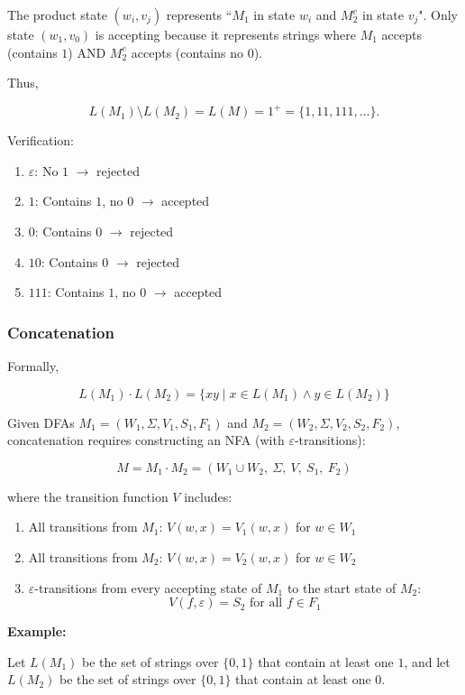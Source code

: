 \documentclass[12pt,a4paper,openany]{article}
\begin{document}
The product state $(w_i, v_j)$ represents ``$M_1$ in state $w_i$ and $M_2^c$ in state $v_j$". Only state $(w_1, v_0)$ is accepting because it represents strings where $M_1$ accepts (contains $1$) AND $M_2^c$ accepts (contains no $0$).

Thus,

\[
L(M_1) \setminus L(M_2) = L(M) = 1^+ = \{1, 11, 111, \ldots\}.
\]

Verification:

\begin{enumerate}
    \item $\varepsilon$: No $1$ $\to$ rejected 
    \item $1$: Contains $1$, no $0$ $\to$ accepted 
    \item $0$: Contains $0$ $\to$ rejected 
    \item $10$: Contains $0$ $\to$ rejected 
    \item $111$: Contains $1$, no $0$ $\to$ accepted 
\end{enumerate}

\subsubsection{Concatenation}

Formally,

\[L(M_1) \cdot L(M_2) = \{xy \mid x \in L(M_1) \land y \in L(M_2)\}\]

Given DFAs $M_1 = (W_1, \Sigma, V_1, S_1, F_1)$ and $M_2 = (W_2, \Sigma, V_2, S_2, F_2)$, concatenation requires constructing an NFA (with $\varepsilon$-transitions):

\[M = M_1 \cdot M_2 = (W_1 \cup W_2,\ \Sigma,\ V,\ S_1,\ F_2)\]

where the transition function $V$ includes:

\begin{enumerate}
    \item All transitions from $M_1$: $V(w, x) = V_1(w, x)$ for $w \in W_1$
    \item All transitions from $M_2$: $V(w, x) = V_2(w, x)$ for $w \in W_2$
    \item $\varepsilon$-transitions from every accepting state of $M_1$ to the start state of $M_2$:
    \[V(f, \varepsilon) = S_2 \text{ for all } f \in F_1\]
\end{enumerate}

\textbf{Example:}

Let $L(M_1)$ be the set of strings over $\{0,1\}$ that contain at least one $1$,  
and let $L(M_2)$ be the set of strings over $\{0,1\}$ that contain at least one $0$.
\end{document}
